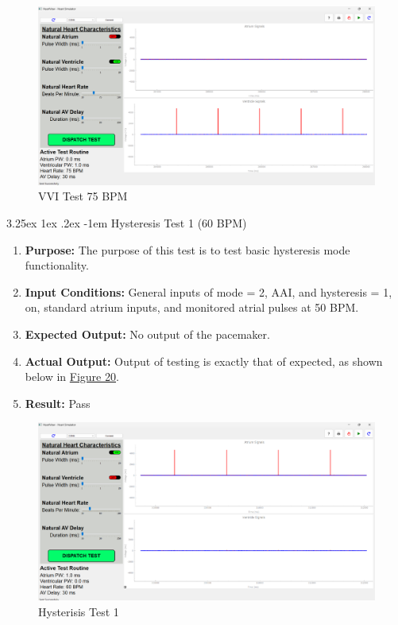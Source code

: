 \documentclass{article}
\makeatletter
\newcounter{subsubsubsection}[subsubsection]
\renewcommand\paragraph{\@startsection{paragraph}{5}{\z@}%
  {3.25ex \@plus1ex \@minus.2ex}%
  {-1em}%
  {\normalfont\normalsize\bfseries}}
\makeatother
\begin{document}
\begin{tcolorbox}
    \begin{figure}[H]\label{VVItest75}
        \includegraphics[width=\textwidth]{VVItest75.png}
        \caption{VVI Test 75 BPM}
    \end{figure}
\end{tcolorbox}

\newpage
{}

\paragraph{Hysteresis Test 1 (60 BPM)}

\begin{enumerate}[label=]
   \item \textbf{Purpose:} The purpose of this test is to test basic hysteresis mode functionality.
   \item \textbf{Input Conditions:} General inputs of mode = 2, AAI, and hysteresis = 1, on, standard atrium 
   inputs, and monitored atrial pulses at 50 BPM.
   \item \textbf{Expected Output:} No output of the pacemaker.
   \item \textbf{Actual Output:} Output of testing is exactly that of expected, as shown below in \hyperref[Hystest1]{Figure 20}.
   \item \textbf{Result:} Pass
\end{enumerate}

\begin{tcolorbox}
    \begin{figure}[H]\label{Hystest1}
        \includegraphics[width=\textwidth]{hystherisistest.png}
        \caption{Hysterisis Test 1}
    \end{figure}
\end{tcolorbox}
\end{document}
